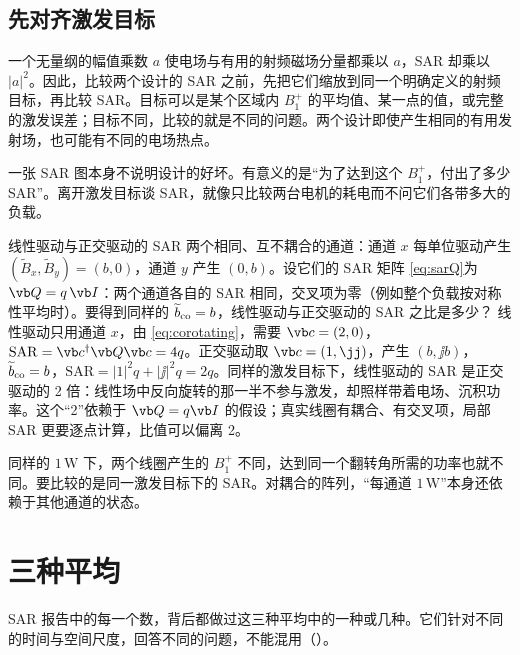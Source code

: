 \subsection{先对齐激发目标}
一个无量纲的幅值乘数 $a$ 使电场与有用的射频磁场分量都乘以 $a$，SAR 却乘以 $|a|^2$。因此，比较两个设计的 SAR 之前，先把它们缩放到同一个明确定义的射频目标，再比较 SAR。目标可以是某个区域内 $B_1^+$ 的平均值、某一点的值，或完整的激发误差；目标不同，比较的就是不同的问题。两个设计即使产生相同的有用发射场，也可能有不同的电场热点。

\begin{intuition}
一张 SAR 图本身不说明设计的好坏。有意义的是“为了达到这个 $B_1^+$，付出了多少 SAR”。离开激发目标谈 SAR，就像只比较两台电机的耗电而不问它们各带多大的负载。
\end{intuition}

\begin{example}[label=ex:rf-quad]{线性驱动与正交驱动的 SAR}
两个相同、互不耦合的通道：通道 $x$ 每单位驱动产生 $(\widetilde B_x,\widetilde B_y)=(b,0)$，通道 $y$ 产生 $(0,b)$。设它们的 SAR 矩阵 \eqref{eq:sarQ}为 $\vb Q=q\,\vb I$：两个通道各自的 SAR 相同，交叉项为零（例如整个负载按对称性平均时）。要得到同样的 $\widetilde b_{\rm co}=b$，线性驱动与正交驱动的 SAR 之比是多少？
\solution
线性驱动只用通道 $x$，由 \eqref{eq:corotating}，需要 $\vb c=(2,0)$，$\mathrm{SAR}=\vb c^\dagger\vb Q\vb c=4q$。正交驱动取 $\vb c=(1,\jj)$，产生 $(b,\jj b)$，$\widetilde b_{\rm co}=b$，$\mathrm{SAR}=|1|^2q+|\jj|^2q=2q$。同样的激发目标下，线性驱动的 SAR 是正交驱动的 2 倍：线性场中反向旋转的那一半不参与激发，却照样带着电场、沉积功率。这个“2”依赖于 $\vb Q=q\vb I$ 的假设；真实线圈有耦合、有交叉项，局部 SAR 更要逐点计算，比值可以偏离 2。
\end{example}

\begin{pitfall}
同样的 $1\,\mathrm W$ 下，两个线圈产生的 $B_1^+$ 不同，达到同一个翻转角所需的功率也就不同。要比较的是同一激发目标下的 SAR。对耦合的阵列，“每通道 $1\,\mathrm W$”本身还依赖于其他通道的状态。
\end{pitfall}

\section{三种平均}\label{sec:rf-averages}

SAR 报告中的每一个数，背后都做过这三种平均中的一种或几种。它们针对不同的时间与空间尺度，回答不同的问题，不能混用（）。

